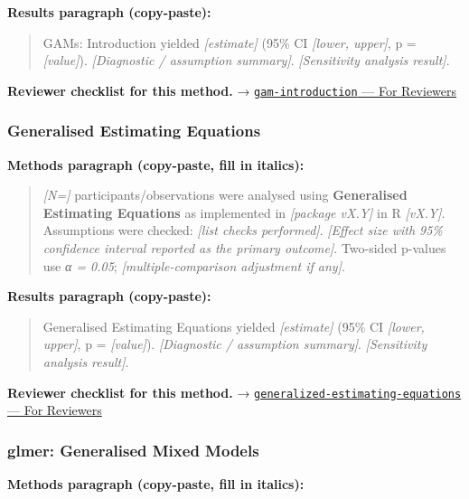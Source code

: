 \documentclass[
]{article}
\begin{document}
\textbf{Results paragraph (copy-paste):}

\begin{quote}
GAMs: Introduction yielded \emph{{[}estimate{]}} (95\% CI
\emph{{[}lower, upper{]}}, p = \emph{{[}value{]}}). \emph{{[}Diagnostic
/ assumption summary{]}}. \emph{{[}Sensitivity analysis result{]}}.
\end{quote}

\textbf{Reviewer checklist for this method.} →
\href{../chapters/07-regression/gam-introduction.Rmd\#for-reviewers}{\texttt{gam-introduction}
--- For Reviewers}

\subsubsection{Generalised Estimating
Equations}\label{generalised-estimating-equations}

\textbf{Methods paragraph (copy-paste, fill in italics):}

\begin{quote}
\emph{{[}N={]}} participants/observations were analysed using
\textbf{Generalised Estimating Equations} as implemented in
\emph{{[}package vX.Y{]}} in R \emph{{[}vX.Y{]}}. Assumptions were
checked: \emph{{[}list checks performed{]}}. \emph{{[}Effect size with
95\% confidence interval reported as the primary outcome{]}}. Two-sided
p-values use \emph{α = 0.05}; \emph{{[}multiple-comparison adjustment if
any{]}}.
\end{quote}

\textbf{Results paragraph (copy-paste):}

\begin{quote}
Generalised Estimating Equations yielded \emph{{[}estimate{]}} (95\% CI
\emph{{[}lower, upper{]}}, p = \emph{{[}value{]}}). \emph{{[}Diagnostic
/ assumption summary{]}}. \emph{{[}Sensitivity analysis result{]}}.
\end{quote}

\textbf{Reviewer checklist for this method.} →
\href{../chapters/07-regression/generalized-estimating-equations.Rmd\#for-reviewers}{\texttt{generalized-estimating-equations}
--- For Reviewers}

\subsubsection{glmer: Generalised Mixed
Models}\label{glmer-generalised-mixed-models}

\textbf{Methods paragraph (copy-paste, fill in italics):}
\end{document}
